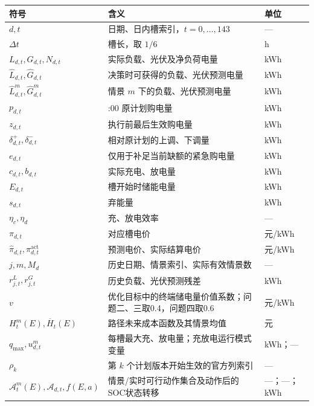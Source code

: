 \documentclass[zihao=-4,a4paper,UTF8,fontset=none]{ctexart}
\newcounter{none}
\begin{document}
{\def\LTcaptype{none} %
\begin{longtable}[]{@{}
  >{\centering\arraybackslash}p{}
  >{\centering\arraybackslash}p{}
  >{\centering\arraybackslash}p{}@{}}
\toprule\noalign{}
\begin{minipage}[b]{\linewidth}\centering
符号
\end{minipage} & \begin{minipage}[b]{\linewidth}\centering
含义
\end{minipage} & \begin{minipage}[b]{\linewidth}\centering
单位
\end{minipage} \\
\midrule\noalign{}
\endhead
\bottomrule\noalign{}
\endlastfoot
\(d,t\) & 日期、日内槽索引，\(t=0,\ldots,143\) & --- \\
\(\Delta t\) & 槽长，取 \(1/6\) & h \\
\(L_{d,t},G_{d,t},N_{d,t}\) & 实际负载、光伏及净负荷电量 & kWh \\
\(\widehat L_{d,t},\widehat G_{d,t}\) & 决策时可获得的负载、光伏预测电量 & kWh \\
\(\widehat L^m_{d,t},\widehat G^m_{d,t}\) & 情景 \(m\) 下的负载、光伏预测电量 & kWh \\
\(p_{d,t}\) & 0:00 原计划购电量 & kWh \\
\(z_{d,t}\) & 执行前最后生效购电量 & kWh \\
\(\delta^+_{d,t},\delta^-_{d,t}\) & 相对原计划的上调、下调量 & kWh \\
\(e_{d,t}\) & 仅用于补足当前缺额的紧急购电量 & kWh \\
\(c_{d,t},b_{d,t}\) & 实际充电、放电量 & kWh \\
\(E_{d,t}\) & 槽开始时储能电量 & kWh \\
\(s_{d,t}\) & 弃能量 & kWh \\
\(\eta_c,\eta_d\) & 充、放电效率 & --- \\
\(\pi_{d,t}\) & 对应槽电价 & 元/kWh \\
\(\widehat\pi_{d,t},\pi^{\mathrm{act}}_{d,t}\) & 预测电价、实际结算电价 & 元/kWh \\
\(j,m,M_d\) & 历史日期、情景索引、实际有效情景数 & --- \\
\(r^L_{j,t},r^G_{j,t}\) & 历史负载、光伏预测残差 & kWh \\
\(v\) & 优化目标中的终端储电量价值系数；问题二、三取0.4，问题四取0.6 & 元/kWh \\
\(H_t^m(E),\overline H_t(E)\) & 路径未来成本函数及其情景均值 & 元 \\
\(q_{\max},u_{d,t}^m\) & 每槽最大充、放电量；充放电运行模式变量 & kWh；--- \\
\(\rho_k\) & 第 \(k\) 个计划版本开始生效的官方列索引 & --- \\
\(\mathcal A_t^m(E),\mathcal A_{d,t},f(E,a)\) & 情景/实时可行动作集合及动作后的SOC状态转移 & ---；---；kWh \\
\end{longtable}
}
\end{document}
